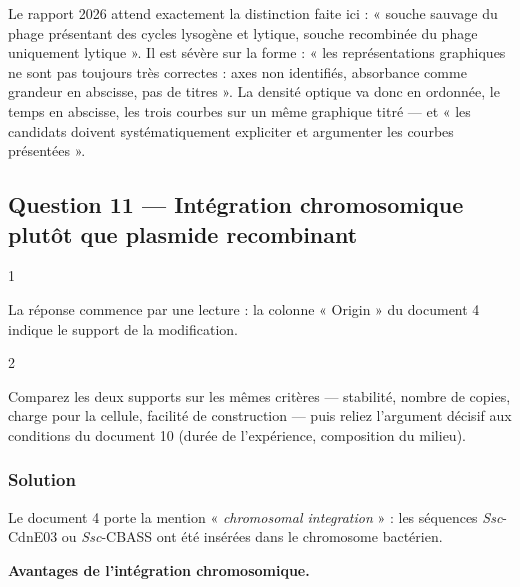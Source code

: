 \documentclass[11pt,a4paper]{article}
\begin{document}
\begin{jury}

Le rapport 2026 attend exactement la distinction faite ici : « souche sauvage du phage présentant des cycles lysogène et lytique, souche recombinée du phage uniquement lytique ». Il est sévère sur la forme : « les représentations graphiques ne sont pas toujours très correctes : axes non identifiés, absorbance comme grandeur en abscisse, pas de titres ». La densité optique va donc en ordonnée, le temps en abscisse, les trois courbes sur un même graphique titré --- et « les candidats doivent systématiquement expliciter et argumenter les courbes présentées ».

\end{jury}

\hypertarget{question-11-intuxe9gration-chromosomique-plutuxf4t-que-plasmide-recombinant}{%
\subsection{Question 11 --- Intégration chromosomique plutôt que plasmide recombinant}\label{question-11-intuxe9gration-chromosomique-plutuxf4t-que-plasmide-recombinant}}

\begin{indication}{1}

La réponse commence par une lecture : la colonne « Origin » du document 4 indique le support de la modification.

\end{indication}

\begin{indication}{2}

Comparez les deux supports sur les mêmes critères --- stabilité, nombre de copies, charge pour la cellule, facilité de construction --- puis reliez l'argument décisif aux conditions du document 10 (durée de l'expérience, composition du milieu).

\end{indication}

\hypertarget{solution-10}{%
\subsubsection{Solution}\label{solution-10}}

Le document 4 porte la mention « \emph{chromosomal integration} » : les séquences \emph{Ssc}-CdnE03 ou \emph{Ssc}-CBASS ont été insérées dans le chromosome bactérien.

\textbf{Avantages de l'intégration chromosomique.}
\end{document}
